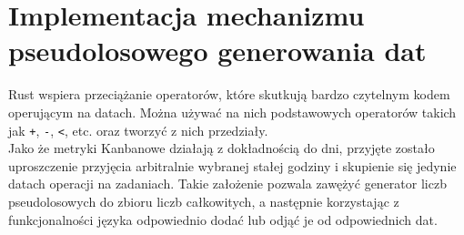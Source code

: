\section{Implementacja mechanizmu pseudolosowego generowania dat}
Rust wspiera przeciążanie operatorów, które skutkują bardzo czytelnym kodem operującym na datach.
Można używać na nich podstawowych operatorów takich jak \texttt{+}, \texttt{-}, \texttt{<}, etc. oraz tworzyć z nich przedziały.\\
Jako że metryki Kanbanowe działają z dokładnością do dni, przyjęte zostało uproszczenie przyjęcia arbitralnie wybranej stałej godziny
i skupienie się jedynie datach operacji na zadaniach.
Takie założenie pozwala zawężyć generator liczb pseudolosowych do zbioru liczb całkowitych, a następnie korzystając z funkcjonalności języka
odpowiednio dodać lub odjąć je od odpowiednich dat.
